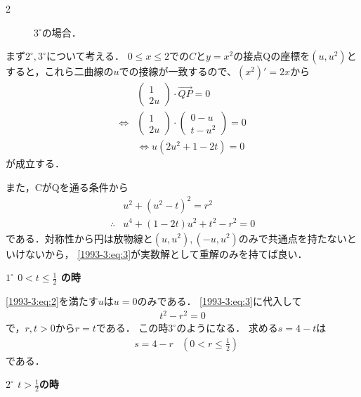 \documentclass[../../../../main.tex]{subfiles}
\begin{document}
\begin{multicols}{2}
\begin{figure}[H]
    \caption{$3^{\circ}$の場合．}
    \label{1993-3:fig:3}
  \end{figure}


  まず$2^{\circ}, 3^{\circ}$について考える．
  $0\le x \le 2$での$C$と$y=x^2$の接点Qの座標を$(u,u^2)$とすると，これら二曲線の$u$での接線が一致するので、$(x^2)'=2x$から
  \begin{align}
     & \begin{pmatrix} 1 \\ 2u \end{pmatrix} \cdot \vec{QP} = 0                                   \\
    \Leftrightarrow
     & \begin{pmatrix} 1 \\ 2u \end{pmatrix} \cdot \begin{pmatrix} 0-u \\ t-u^2 \end{pmatrix} = 0 \\
     & \Leftrightarrow
    u(2u^2+1-2t) = 0 \label{1993-3:eq:2}
  \end{align}
  が成立する．

  また，CがQを通る条件から
  \begin{align}
     & u^2+(u^2-t)^2=r^2                            \\
    \therefore
     & u^4+(1-2t)u^2+t^2-r^2=0  \label{1993-3:eq:3}
  \end{align}
  である．対称性から円は放物線と$(u,u^2), (-u,u^2)$のみで共通点を持たないといけないから，
  \cref{1993-3:eq:3}が実数解として重解のみを持てば良い．

  \vspace{5pt}
  \textbf{$1^{\circ}$ $0<t \le \frac{1}{2}$ の時}

  \cref{1993-3:eq:2}を満たす$u$は$u=0$のみである．
  \cref{1993-3:eq:3}に代入して
  \begin{align*}
    t^2-r^2 = 0
  \end{align*}
  で，$r,t>0$から$r=t$である．
  この時$3^{\circ}$のようになる．
  求める$s=4-t$は
  \begin{align}
     & s = 4 -r & \left(0 < r \le \frac{1}{2}\right)\label{1993-3:eq:4}
  \end{align}
  である．

  \vspace{5pt}
  \textbf{$2^{\circ}$ $t>\frac{1}{2}$の時}


\end{multicols}
\end{document}

